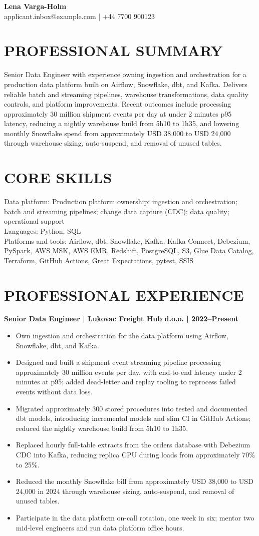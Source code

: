 \documentclass[11pt,a4paper]{article}
\begin{document}
{\LARGE\bfseries\color{primarycolor} Lena Varga-Holm}\\
applicant.inbox@example.com | +44 7700 900123

\section*{PROFESSIONAL SUMMARY}
Senior Data Engineer with experience owning ingestion and orchestration for a production data platform built on Airflow, Snowflake, dbt, and Kafka. Delivers reliable batch and streaming pipelines, warehouse transformations, data quality controls, and platform improvements. Recent outcomes include processing approximately 30 million shipment events per day at under 2 minutes p95 latency, reducing a nightly warehouse build from 5h10 to 1h35, and lowering monthly Snowflake spend from approximately USD 38,000 to USD 24,000 through warehouse sizing, auto-suspend, and removal of unused tables.

\section*{CORE SKILLS}
Data platform: Production platform ownership; ingestion and orchestration; batch and streaming pipelines; change data capture (CDC); data quality; operational support\\
Languages: Python, SQL\\
Platforms and tools: Airflow, dbt, Snowflake, Kafka, Kafka Connect, Debezium, PySpark, AWS MSK, AWS EMR, Redshift, PostgreSQL, S3, Glue Data Catalog, Terraform, GitHub Actions, Great Expectations, pytest, SSIS

\section*{PROFESSIONAL EXPERIENCE}
\textbf{Senior Data Engineer | Lukovac Freight Hub d.o.o. | 2022–Present}
\begin{itemize}
\item Own ingestion and orchestration for the data platform using Airflow, Snowflake, dbt, and Kafka.
\item Designed and built a shipment event streaming pipeline processing approximately 30 million events per day, with end-to-end latency under 2 minutes at p95; added dead-letter and replay tooling to reprocess failed events without data loss.
\item Migrated approximately 300 stored procedures into tested and documented dbt models, introducing incremental models and slim CI in GitHub Actions; reduced the nightly warehouse build from 5h10 to 1h35.
\item Replaced hourly full-table extracts from the orders database with Debezium CDC into Kafka, reducing replica CPU during loads from approximately 70\% to 25\%.
\item Reduced the monthly Snowflake bill from approximately USD 38,000 to USD 24,000 in 2024 through warehouse sizing, auto-suspend, and removal of unused tables.
\item Participate in the data platform on-call rotation, one week in six; mentor two mid-level engineers and run data platform office hours.
\end{itemize}
\end{document}
